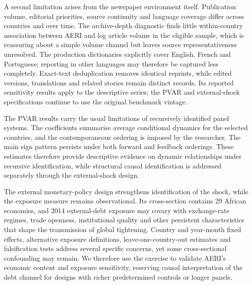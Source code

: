 \documentclass[12pt]{article}
\begin{document}
A second limitation arises from the newspaper environment itself. Publication volume, editorial priorities, source continuity and language coverage differ across countries and over time. The archive-depth diagnostic finds little within-country association between AERI and log article volume in the eligible sample, which is reassuring about a simple volume channel but leaves source representativeness unresolved. The production dictionaries explicitly cover English, French and Portuguese; reporting in other languages may therefore be captured less completely. Exact-text deduplication removes identical reprints, while edited versions, translations and related stories remain distinct records. Its reported sensitivity results apply to the descriptive series; the PVAR and external-shock specifications continue to use the original benchmark vintage.

The PVAR results carry the usual limitations of recursively identified panel systems. The coefficients summarise average conditional dynamics for the selected countries, and the contemporaneous ordering is imposed by the researcher. The main sign pattern persists under both forward and feedback orderings. These estimates therefore provide descriptive evidence on dynamic relationships under recursive identification, while structural causal identification is addressed separately through the external-shock design.

The external monetary-policy design strengthens identification of the shock, while the exposure measure remains observational. Its cross-section contains 29 African economies, and 2014 external-debt exposure may covary with exchange-rate regimes, trade openness, institutional quality and other persistent characteristics that shape the transmission of global tightening. Country and year-month fixed effects, alternative exposure definitions, leave-one-country-out estimates and falsification tests address several specific concerns, yet some cross-sectional confounding may remain. We therefore use the exercise to validate AERI's economic content and exposure sensitivity, reserving causal interpretation of the debt channel for designs with richer predetermined controls or longer panels.
\clearpage
{}
\begingroup
\small
\singlespacing
\printbibliography[heading=none]
\endgroup
\clearpage\appendix
{}
\end{document}
